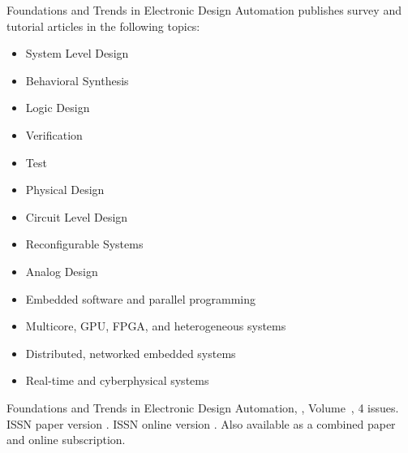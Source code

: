 


\journalaimsandscope
 {%
  Foundations and Trends\textsuperscript{\textregistered} in
Electronic Design Automation publishes
 survey and tutorial articles in the following topics: 
\begin{itemize}
\item{System Level Design}
    \item{Behavioral Synthesis}
    \item{Logic Design}
    \item{Verification}
    \item{Test}
    \item{Physical Design}
    \item{Circuit Level Design}
    \item{Reconfigurable Systems}
    \item{Analog Design}
    \item{Embedded software and parallel programming}
   \item{Multicore, GPU, FPGA, and heterogeneous systems}
    \item{Distributed, networked embedded systems}
    \item{Real-time and cyberphysical systems}
\end{itemize}
 }

\journallibraryinfo
 {%
  Foundations and Trends\textsuperscript{\textregistered} in
  Electronic Design Automation, ,
  Volume~, 4 issues.
  ISSN paper version .
  ISSN online version .
  Also available as a combined paper and online
  subscription.
 } 